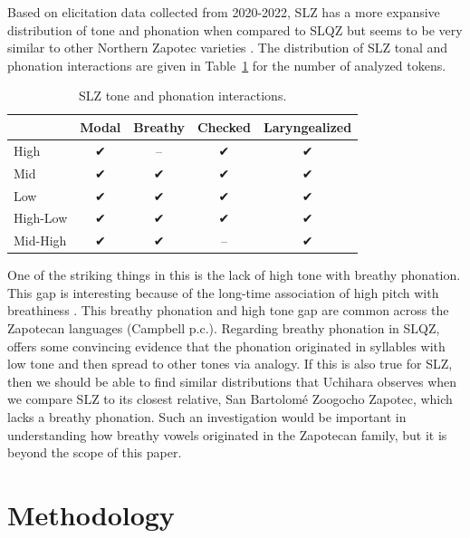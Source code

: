 \documentclass[12pt, letterpaper]{article}
\providecommand{\lsptoprule}{\midrule\toprule}
\providecommand{\lspbottomrule}{\bottomrule\midrule}
\begin{document}
Based on elicitation data collected from 2020-2022, SLZ has a more expansive distribution of tone and phonation when compared to SLQZ but seems to be very similar to other Northern Zapotec varieties \citep[e.g.,][]{avelinobecerraTopicsYalalagZapotec2004}. The distribution of SLZ tonal and phonation interactions are given in Table~\ref{tab:ToneVoiceQuality} for the number of analyzed tokens. 
\begin{table}[!h]
	\caption{SLZ tone and phonation interactions.}
	\label{tab:ToneVoiceQuality}
	\centering

	\begin{tabular}{lcccc}
	\lsptoprule
		& \textbf{Modal} & \textbf{Breathy} & \textbf{Checked} & \textbf{Laryngealized} \\
	\hline
	High		& ✔︎ & -- & ✔︎ & ✔︎ \\
	Mid			& ✔︎ & ✔︎ & ✔︎ & ✔︎ \\
	Low			& ✔︎ & ✔︎ & ✔︎ & ✔︎ \\
	High-Low	& ✔︎ & ✔︎ & ✔︎ & ✔︎ \\
	Mid-High	& ✔︎	& ✔︎ & -- & ✔︎ \\
	\lspbottomrule
	\end{tabular}
\end{table}

One of the striking things in this is the lack of high tone with breathy phonation. This gap is interesting because of the long-time association of high pitch with breathiness \citep[a good overview–of this association and other phonation types–is found in][]{eslingVoiceQualityLaryngeal2019}. This breathy phonation and high tone gap are common across the Zapotecan languages (Campbell p.c.). Regarding breathy phonation in SLQZ, \citet{uchiharaToneRegistrogenesisQuiavini2016} offers some convincing evidence that the phonation originated in syllables with low tone and then spread to other tones via analogy. If this is also true for SLZ, then we should be able to find similar distributions that Uchihara observes when we compare SLZ to its closest relative, San Bartolomé Zoogocho Zapotec, which lacks a breathy phonation. Such an investigation would be important in understanding how breathy vowels originated in the Zapotecan family, but it is beyond the scope of this paper.  

\section{Methodology} \label{sec:Methods}
\end{document}
